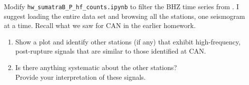 
Modify {\tt hw\_sumatraB\_P\_hf\_counts.ipynb}
to filter the BHZ time series from . 
I suggest loading the entire data set and browsing all the stations, one seismogram at a time.
Recall what we saw for CAN in the earlier homework.
%
\begin{enumerate}
\item Show a plot and identify other stations (if any) that exhibit high-frequency, post-rupture signals that are similar to those identified at CAN.
\item Is there anything systematic about the other stations? \\
Provide your interpretation of these signals.
\end{enumerate}
